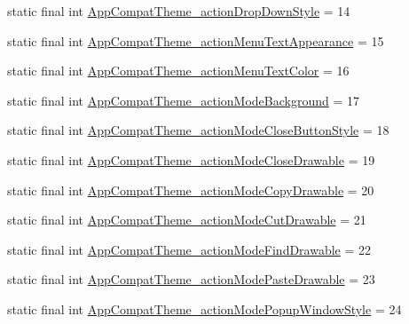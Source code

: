 \begin{DoxyCompactItemize}
\item 
static final int \mbox{\hyperlink{classcom_1_1synnapps_1_1carouselview_1_1_r_1_1styleable_a215e248c70539cb0b8f56d63b37e0ce2}{App\+Compat\+Theme\+\_\+action\+Drop\+Down\+Style}} = 14
\item 
static final int \mbox{\hyperlink{classcom_1_1synnapps_1_1carouselview_1_1_r_1_1styleable_ae2d87c137fc4f5fa300606d5a37c7424}{App\+Compat\+Theme\+\_\+action\+Menu\+Text\+Appearance}} = 15
\item 
static final int \mbox{\hyperlink{classcom_1_1synnapps_1_1carouselview_1_1_r_1_1styleable_a55b34faa81eff54c59f69b2598e77667}{App\+Compat\+Theme\+\_\+action\+Menu\+Text\+Color}} = 16
\item 
static final int \mbox{\hyperlink{classcom_1_1synnapps_1_1carouselview_1_1_r_1_1styleable_a44ff739f893346195511fb1fe7a5efc7}{App\+Compat\+Theme\+\_\+action\+Mode\+Background}} = 17
\item 
static final int \mbox{\hyperlink{classcom_1_1synnapps_1_1carouselview_1_1_r_1_1styleable_ab91f244d539025fb9bc11820cd75c6df}{App\+Compat\+Theme\+\_\+action\+Mode\+Close\+Button\+Style}} = 18
\item 
static final int \mbox{\hyperlink{classcom_1_1synnapps_1_1carouselview_1_1_r_1_1styleable_acdcd1829da4a708e36e89990d6ed402a}{App\+Compat\+Theme\+\_\+action\+Mode\+Close\+Drawable}} = 19
\item 
static final int \mbox{\hyperlink{classcom_1_1synnapps_1_1carouselview_1_1_r_1_1styleable_ad98e9fa74eb9eef4fa3c85a1e91487c7}{App\+Compat\+Theme\+\_\+action\+Mode\+Copy\+Drawable}} = 20
\item 
static final int \mbox{\hyperlink{classcom_1_1synnapps_1_1carouselview_1_1_r_1_1styleable_a310ddee83798a54c0154681728cc83a5}{App\+Compat\+Theme\+\_\+action\+Mode\+Cut\+Drawable}} = 21
\item 
static final int \mbox{\hyperlink{classcom_1_1synnapps_1_1carouselview_1_1_r_1_1styleable_a17315f08fd5d9e73c11a921e78a07088}{App\+Compat\+Theme\+\_\+action\+Mode\+Find\+Drawable}} = 22
\item 
static final int \mbox{\hyperlink{classcom_1_1synnapps_1_1carouselview_1_1_r_1_1styleable_a3247136cc6c313867cfbdfc136abe2ab}{App\+Compat\+Theme\+\_\+action\+Mode\+Paste\+Drawable}} = 23
\item 
static final int \mbox{\hyperlink{classcom_1_1synnapps_1_1carouselview_1_1_r_1_1styleable_a3031f1d4af0568ceba9df5881068ae84}{App\+Compat\+Theme\+\_\+action\+Mode\+Popup\+Window\+Style}} = 24
\item 

\end{DoxyCompactItemize}

